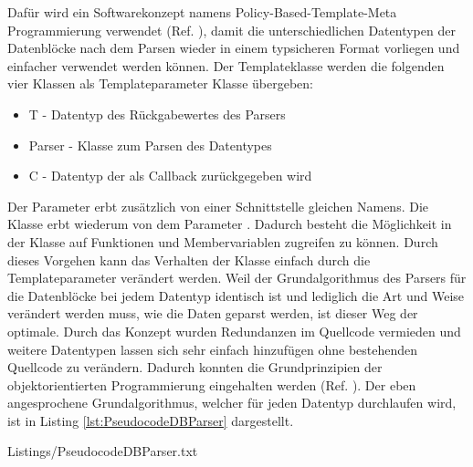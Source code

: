 Daf{\"u}r wird ein Softwarekonzept namens Policy-Based-Template-Meta Programmierung
verwendet (Ref. \cite{Alexandrescu:2001:MCD:377789}), damit die unterschiedlichen Datentypen der Datenbl{\"o}cke nach dem Parsen wieder in einem typsicheren Format vorliegen und
einfacher verwendet werden k{\"o}nnen.
Der Templateklasse werden die folgenden vier Klassen als Templateparameter
Klasse {\"u}bergeben:

\begin{itemize}
\item T - Datentyp des R{\"u}ckgabewertes des Parsers
\item Parser - Klasse zum Parsen des Datentypes
\item C - Datentyp der als Callback zur{\"u}ckgegeben wird
\end{itemize}

Der Parameter  erbt zus{\"a}tzlich von einer
Schnittstelle gleichen Namens. Die Klasse  erbt
wiederum von dem Parameter .
Dadurch besteht die M{\"o}glichkeit in der Klasse auf Funktionen und
Membervariablen zugreifen zu k{\"o}nnen.
Durch dieses Vorgehen kann das Verhalten der Klasse einfach durch die
Templateparameter ver{\"a}ndert werden. Weil der Grundalgorithmus des Parsers
f{\"u}r die Datenbl{\"o}cke bei jedem Datentyp identisch ist und lediglich die
Art und Weise ver{\"a}ndert werden muss, wie die Daten geparst werden,
ist dieser Weg der optimale. Durch das Konzept wurden
Redundanzen im Quellcode vermieden und weitere Datentypen lassen sich
sehr einfach hinzuf{\"u}gen ohne bestehenden Quellcode zu ver{\"a}ndern. Dadurch konnten
die Grundprinzipien der objektorientierten Programmierung eingehalten werden (Ref. \cite{herold2001go}).
Der eben angesprochene Grundalgorithmus, welcher f{\"u}r jeden Datentyp
durchlaufen wird, ist in Listing \ref{lst:PseudocodeDBParser} dargestellt.

\lstset{language=pseudo}
\lstset{commentstyle=\textit}
{Listings/PseudocodeDBParser.txt}
